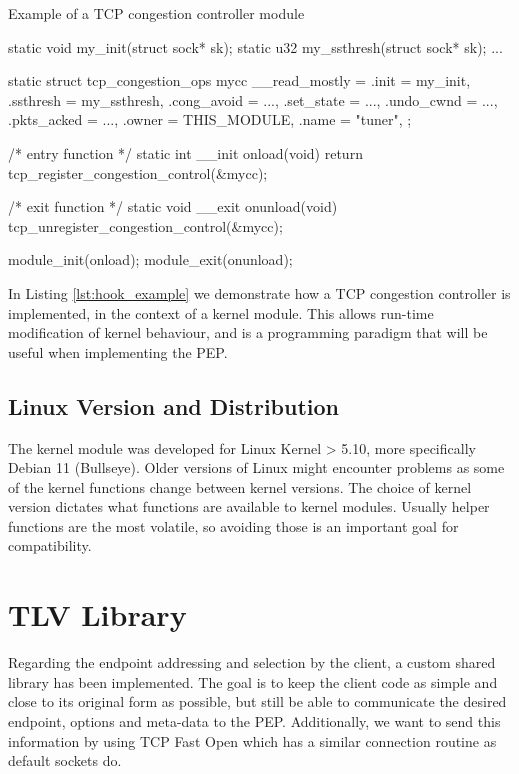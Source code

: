\documentclass[a4paper,english, 11pt]{report}
\begin{document}
\begin{autonumlstlisting}[label=lst:hook_example]{Example of a TCP congestion controller module}

static void my_init(struct sock* sk);
static u32 my_ssthresh(struct sock* sk);
...

static struct tcp_congestion_ops mycc __read_mostly = {
  .init           = my_init,
  .ssthresh       = my_ssthresh,
  .cong_avoid     = ...,
  .set_state      = ...,
  .undo_cwnd      = ...,
  .pkts_acked     = ...,
  .owner          = THIS_MODULE,
  .name           = "tuner",
};

/* entry function */
static int __init onload(void) {
    return tcp_register_congestion_control(&mycc);
}

/* exit function */
static void __exit onunload(void) {
    tcp_unregister_congestion_control(&mycc);
}

module_init(onload);
module_exit(onunload);
\end{autonumlstlisting}
In Listing \ref{lst:hook_example} we demonstrate how a TCP congestion controller is implemented, in the context of a kernel module. This allows run-time modification of kernel behaviour, and is a programming paradigm that will be useful when implementing the PEP.


\subsection{Linux Version and Distribution}
The kernel module was developed for Linux Kernel > 5.10, more specifically Debian 11 (Bullseye). Older versions of Linux might encounter problems as some of the kernel functions change between kernel versions. The choice of kernel version dictates what functions are available to kernel modules. Usually helper functions are the most volatile, so avoiding those is an important goal for compatibility.

\section{TLV Library}
Regarding the endpoint addressing and selection by the client, a custom shared library has been implemented. The goal is to keep the client code as simple and close to its original form as possible, but still be able to communicate the desired endpoint, options and meta-data to the PEP. Additionally, we want to send this information by using TCP Fast Open which has a similar connection routine as default sockets do.\\
\end{document}
